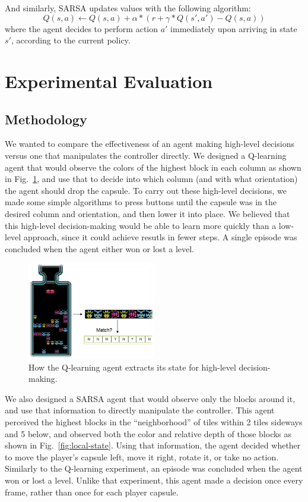 \documentclass[letterpaper]{article} %
\begin{document}
And similarly, SARSA updates values with the following algorithm:
\begin{equation}
Q(s, a) \leftarrow Q(s, a) + \alpha * (r + \gamma * Q(s', a') - Q(s, a))
\end{equation}
where the agent decides to perform action \(a'\) immediately upon arriving in state \(s'\), according to the current policy.

\section{Experimental Evaluation}
\subsection{Methodology}
We wanted to compare the effectiveness of an agent making high-level decisions versus one that manipulates the controller directly. We designed a Q-learning agent that would observe the colors of the highest block in each column as shown in Fig.~\ref{fig:high-level-state}, and use that to decide into which column (and with what orientation) the agent should drop the capsule. To carry out these high-level decisions, we made some simple algorithms to press buttons until the capsule was in the desired column and orientation, and then lower it into place. We believed that this high-level decision-making would be able to learn more quickly than a low-level approach, since it could achieve resutls in fewer steps. A single episode was concluded when the agent either won or lost a level.

\begin{figure}
\includegraphics[width=0.5\textwidth]{high-level-state.png}
\caption{How the Q-learning agent extracts its state for high-level decision-making.}\label{fig:high-level-state}
\end{figure}

We also designed a SARSA agent that would observe only the blocks around it, and use that information to directly manipulate the controller. This agent perceived the highest blocks in the ``neighborhood'' of tiles within 2 tiles sideways and 5 below, and observed both the color and relative depth of those blocks as shown in Fig.~\ref{fig:local-state}. Using that information, the agent decided whether to move the player's capsule left, move it right, rotate it, or take no action. Similarly to the Q-learning experiment, an episode was concluded when the agent won or lost a level. Unlike that experiment, this agent made a decision once every frame, rather than once for each player capsule.
\end{document}
